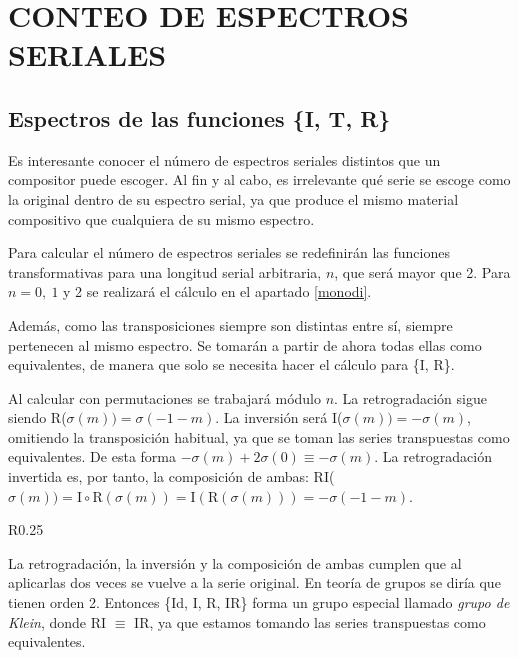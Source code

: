 	\chapter{CONTEO DE ESPECTROS SERIALES}
	\section{Espectros de las funciones \{I, T, R\}}
		\label{espec}
		Es interesante conocer el número de espectros seriales distintos que un compositor puede escoger. Al fin y al cabo, es irrelevante qué serie se escoge como la original dentro de su espectro serial, ya que produce el mismo material compositivo que cualquiera de su mismo espectro.
		
		Para calcular el número de espectros seriales se redefinirán las funciones transformativas para una longitud serial arbitraria, $n$, que será mayor que 2. Para $n=0,\ 1$ y 2 se realizará el cálculo en el apartado \ref{monodi}. 
	
		Además, como las transposiciones siempre son distintas entre sí, siempre pertenecen al mismo espectro. Se tomarán a partir de ahora todas ellas como equivalentes, de manera que solo se necesita hacer el cálculo para \{I, R\}.
		
		Al calcular con permutaciones se trabajará módulo $n$. La retrogradación sigue siendo R($\sigma(m))=\sigma(-1-m)$. La inversión será I($\sigma(m))=-\sigma(m)$, omitiendo la transposición habitual, ya que se toman las series transpuestas como equivalentes. De esta forma $-\sigma(m)+2\sigma(0)\equiv-\sigma(m)$. La retrogradación invertida es, por tanto, la composición de ambas: RI($\sigma(m))=\text{I}\circ\text{R}(\sigma(m))=\text{I}\left(\text{R}(\sigma(m))\right)=-\sigma(-1-m)$.			
		
		\begin{wrapfigure}{R}{0.25\textwidth}
			\captionsetup{justification=centering, font=footnotesize}
			\vspace*{-\bigskipamount}
			
			\vspace*{-\bigskipamount}
		\end{wrapfigure}		
		La retrogradación, la inversión y la composición de ambas cumplen que al aplicarlas dos veces se vuelve a la serie original. En teoría de grupos se diría que tienen orden 2. Entonces \{Id, I, R, IR\} forma un grupo especial llamado \textit{grupo de Klein}, donde RI $\equiv$ IR, ya que estamos tomando las series transpuestas como equivalentes. 
		
